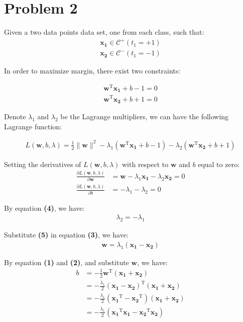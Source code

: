 \documentclass[twoside,11pt]{homework}
\newcommand{\vect}[1]{\boldsymbol{\mathbf{#1}}}
\begin{document}
\section*{Problem 2}
Given a two data points data set, one from each class, such that:
\begin{align*}
\vect{x_1} \in \mathcal{C}^+ (t_1=+1)\\
\vect{x_2} \in \mathcal{C}^- (t_1=-1)
\end{align*}

In order to maximize margin, there exist two constraints:

\begin{align}
\vect{w}^\mathrm{T} \vect{x_1} + b - 1 = 0 \\
\vect{w}^\mathrm{T} \vect{x_2} + b + 1 = 0
\end{align}

Denote $\lambda_1$ and $\lambda_2$ be the Lagrange multipliers, we can have the following Lagrange function:

\begin{align*}
L(\vect{w}, b, \lambda) = \frac{1}{2} \lVert \vect{w} \rVert^2 - \lambda_1 (\vect{w}^\mathrm{T} \vect{x_1} + b -1) - \lambda_2 (\vect{w}^\mathrm{T} \vect{x_2} + b +1)
\end{align*}

Setting the derivatives of $L(\vect{w}, b, \lambda)$ with respect to $\vect{w}$ and $b$ equal to zero:
\begin{align}
\frac{\partial L(\vect{w}, b, \lambda)  }{\partial \vect{w}} 
&=\vect{w} - \lambda_1 \vect{x_1} - \lambda_2 \vect{x_2}
= 0\\
\frac{\partial L(\vect{w}, b, \lambda)  }{\partial b} 
&= - \lambda_1 -  \lambda_2
= 0
\end{align}

By equation \textbf{(4)}, we have:
\begin{align}
\lambda_2 = -\lambda_1
\end{align}

Substitute \textbf{(5)} in equation \textbf{(3)}, we have:
\begin{align}
\vect{w} = \lambda_1(\vect{x_1} - \vect{x_2})
\end{align}

By equation \textbf{(1)} and \textbf{(2)}, and substitute $\vect{w}$, we have:
\begin{align*}
b 
&= -\frac{1}{2} \vect{w}^\mathrm{T} (\vect{x_1} + \vect{x_2})\\
&=  -\frac{\lambda_1}{2} (\vect{x_1} - \vect{x_2})^\mathrm{T} (\vect{x_1} + \vect{x_2})\\
&=  -\frac{\lambda_1}{2} (\vect{x_1}^\mathrm{T} - \vect{x_2}^\mathrm{T}) (\vect{x_1} + \vect{x_2})\\
&=  -\frac{\lambda_1}{2} (\vect{x_1}^\mathrm{T}\vect{x_1} - \vect{x_2}^\mathrm{T}\vect{x_2})
\end{align*}
\end{document}
